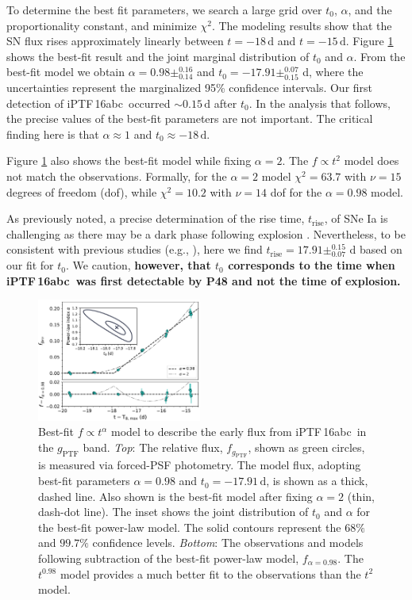 \documentclass[twocolumn]{aastex61}
\newcommand{\abc}{iPTF\,16abc}
\begin{document}
To determine the best fit parameters, we search a large grid over $t_0$,
$\alpha$, and the proportionality constant, and minimize $\chi^2$. The
modeling results show that the SN flux rises approximately linearly between
$t=-18\,\mathrm{d}$ and $t=-15\,\mathrm{d}$. Figure \ref{fig:early_lc_fit}
shows the best-fit result and the joint marginal distribution of $t_0$ and
$\alpha$. From the best-fit model we obtain $\alpha=0.98 \pm ^{0.16}_{0.14}$
and $t_0=-17.91 \pm ^{0.07}_{0.15}$ d, where the uncertainties represent the
marginalized 95\% confidence intervals. Our first detection of \abc\ occurred
$\sim$${0.15}\,\textrm{d}$ after $t_0$. In the analysis that
follows, the precise values of the best-fit parameters are not important. The
critical finding here is that $\alpha \approx 1$ and $t_0 \approx -18 \,
\mathrm{d}$.

Figure \ref{fig:early_lc_fit} also shows the best-fit model while fixing
$\alpha = 2$. The $f \propto t^2$ model does not match the observations.
Formally, for the $\alpha = 2$ model $\chi^2 = 63.7$ with $\nu = 15$ degrees
of freedom (dof), while $\chi^2 = 10.2$ with $\nu = 14$ dof for the $\alpha =
0.98$ model.

As previously noted, a precise determination of the rise time,
$t_\mathrm{rise}$, of SNe Ia is challenging as there may be a dark phase
following explosion \citep{2014ApJ...784...85P}. Nevertheless, to be
consistent with previous studies (e.g., \citealt{2011MNRAS.416.2607G}), here
we find $t_\mathrm{rise} = 17.91\pm _{0.07}^{0.15}$ d based on our fit for
$t_0$. We caution, \textbf{however, that $t_0$ corresponds to the time when \abc\ was first detectable by P48 and not the time of explosion.}

\begin{figure}[!htb]
  \centering
  \includegraphics[width=0.48\textwidth]{early_lc.pdf}
  \caption{
  Best-fit $f \propto t^\alpha$ model to describe the early flux from \abc\ in
  the $g_\mathrm{PTF}$ band. \textit{Top}: The relative flux,
  $f_{g_\mathrm{PTF}}$, shown as green circles, is measured via forced-PSF
  photometry. The model flux, adopting best-fit parameters $\alpha=0.98$ and
  $t_0=-17.91\,\textrm{d}$, is shown as a thick, dashed line. Also shown is
  the best-fit model after fixing $\alpha=2$ (thin, dash-dot line). The inset
  shows the joint distribution of $t_0$ and $\alpha$ for the best-fit
  power-law model. The solid contours represent the $68\%$ and $99.7\%$
  confidence levels. \textit{Bottom}: The observations and models following
  subtraction of the best-fit power-law model, $f_{\alpha = 0.98}$. The
  $t^{0.98}$ model provides a much better fit to the observations than the
  $t^2$ model.}
  \label{fig:early_lc_fit}
\end{figure}
\end{document}
